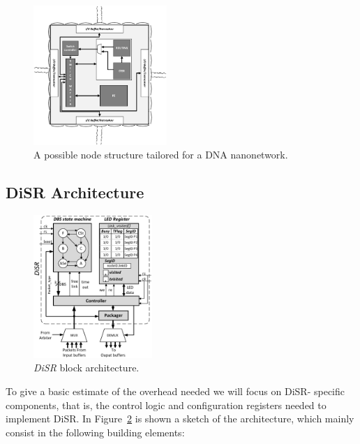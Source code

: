 \begin{figure}
  \centering
  \includegraphics[width=0.45\textwidth]{pictures/node_structure.eps}
  \caption{A possible node structure tailored for a DNA nanonetwork.}
 \label{fig:node_structure}
\end{figure}
\subsection{DiSR Architecture}
\label{ssec:disr_architecture}

\begin{figure}
  \centering
  \includegraphics[width=0.40\textwidth]{pictures/disr_rtl_updated.eps}
  \caption{\emph{DiSR} block architecture.}
 \label{fig:implementation}
\end{figure}

To give a basic estimate of the overhead needed we will focus on DiSR-
specific components, that is, the control logic and configuration
registers needed to implement DiSR. In Figure~\ref{fig:implementation}
is shown a sketch of the  architecture, which mainly consist in the
following building elements:

